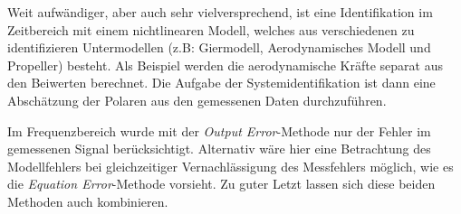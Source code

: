 Weit aufwändiger, aber auch sehr vielversprechend, ist eine Identifikation im Zeitbereich mit einem nichtlinearen 
Modell, welches aus verschiedenen zu identifizieren Untermodellen (z.B: Giermodell, Aerodynamisches Modell und Propeller) besteht. 
Als Beispiel werden die aerodynamische Kräfte separat aus den Beiwerten berechnet. 
Die Aufgabe der Systemidentifikation ist dann eine Abschätzung der Polaren aus den gemessenen Daten durchzuführen.

Im Frequenzbereich wurde mit der \textit{Output Error}-Methode nur der Fehler im gemessenen Signal berücksichtigt. Alternativ 
wäre hier eine Betrachtung des Modellfehlers bei gleichzeitiger Vernachlässigung des Messfehlers möglich, wie es die 
\textit{Equation Error}-Methode vorsieht. Zu guter Letzt lassen sich diese beiden Methoden auch kombinieren.

